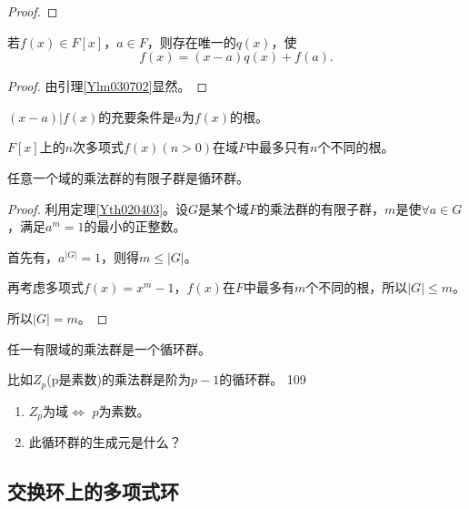 \begin{proof}
	
\end{proof}

\begin{lemma}[余数定理]
	若$f(x)\in F[x]$，$a\in F$，则存在唯一的$q(x)$，使
	\begin{equation*}
		f(x)=(x-a)q(x)+f(a).
	\end{equation*}
\end{lemma}
\begin{proof}
	由引理\ref{Ylm030702}显然。
\end{proof}

\begin{corollary}
	$(x-a)\big| f(x) $的充要条件是$a$为$f(x)$的根。
\end{corollary}

\begin{theorem}
	$F[x]$上的$n$次多项式$f(x)(n>0)$在域$F$中最多只有$n$个不同的根。
\end{theorem}

\begin{theorem}
	任意一个域的乘法群的有限子群是循环群。
\end{theorem}
\begin{proof}
	利用定理\ref{Yth020403}。设$G$是某个域$F$的乘法群的有限子群，$m$是使$\forall a\in G$，满足$a^{m}=1$的最小的正整数。\par
	首先有，$a^{|G|}=1$，则得$m\leq |G|$。\par
	再考虑多项式$f(x)=x^{m}-1$，$f(x)$在$F$中最多有$m$个不同的根，所以$|G|\leq m$。\par
	所以$|G|=m$。
\end{proof}
\begin{corollary}
	任一有限域的乘法群是一个循环群。
\end{corollary}

\original
{
	比如$Z_{p}$(p是素数)的乘法群是阶为$p-1$的循环群。
}{109}
\begin{proposition}
	\begin{enumerate}
		\item $Z_{p}$为域$\Leftrightarrow$ $p$为素数。
		\item 此循环群的生成元是什么？
	\end{enumerate}
\end{proposition}

\subsection{交换环上的多项式环}

